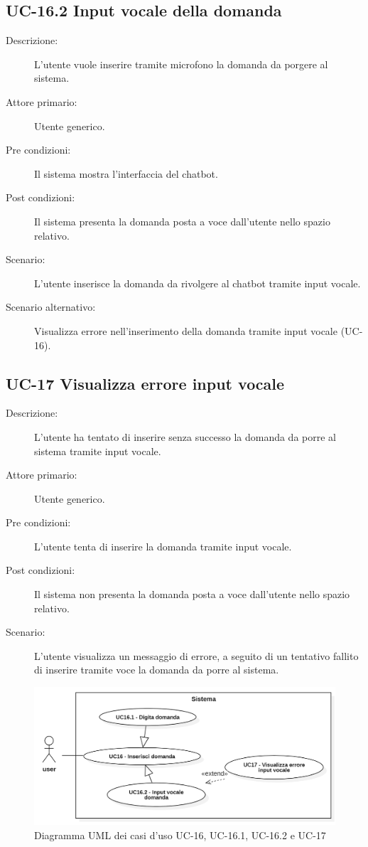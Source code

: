 \subsection{UC-16.2 Input vocale della domanda}
\begin{description}
    \item[Descrizione:] L'utente vuole inserire tramite microfono la domanda da porgere al sistema.
    \item[Attore primario:] Utente generico.
    \item[Pre condizioni:] Il sistema mostra l'interfaccia del chatbot.
    \item[Post condizioni:] Il sistema presenta la domanda posta a voce dall'utente nello spazio relativo.
    \item[Scenario:] L'utente inserisce la domanda da rivolgere al chatbot tramite input vocale.
    \item[Scenario alternativo:] Visualizza errore nell'inserimento della domanda tramite input vocale (UC-16).
\end{description}

\subsection{UC-17 Visualizza errore input vocale}
\begin{description}
    \item[Descrizione:] L'utente ha tentato di inserire senza successo la domanda da porre al sistema tramite input vocale.
    \item[Attore primario:] Utente generico.
    \item[Pre condizioni:] L'utente tenta di inserire la domanda tramite input vocale.
    \item[Post condizioni:] Il sistema non presenta la domanda posta a voce dall'utente nello spazio relativo.
    \item[Scenario:] L'utente visualizza un messaggio di errore, a seguito di un tentativo fallito di inserire tramite voce la domanda da porre al sistema.
\end{description}

\begin{figure}[H]
    \centering
    \includegraphics[width=\linewidth]{UC16-17.PNG}
    \caption{Diagramma UML dei casi d'uso UC-16, UC-16.1, UC-16.2 e UC-17}
    \label{fig:UC16-17}
\end{figure}

